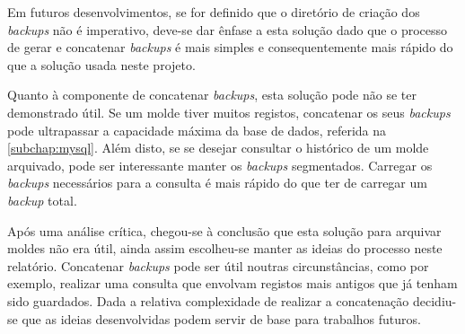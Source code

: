 \documentclass[11pt,twoside,a4paper]{report}
\begin{document}
Em futuros desenvolvimentos, se for definido que o diretório de criação dos \textit{backups} não é imperativo, deve-se dar ênfase a esta solução dado que o processo de gerar e concatenar \textit{backups} é mais simples e consequentemente mais rápido do que a solução usada neste projeto.\par 
Quanto à componente de concatenar \textit{backups}, esta solução pode não se ter demonstrado útil. Se um molde tiver muitos registos, concatenar os seus \textit{backups} pode ultrapassar a capacidade máxima da base de dados, referida na \autoref{subchap:mysql}. Além disto, se se desejar consultar o histórico de um molde arquivado, pode ser interessante manter os \textit{backups} segmentados. Carregar os \textit{backups} necessários para a consulta é mais rápido do que ter de carregar um \textit{backup} total.\par 
Após uma análise crítica, chegou-se à conclusão que esta solução para arquivar moldes não era útil, ainda assim escolheu-se manter as ideias do processo neste relatório. Concatenar \textit{backups} pode ser útil noutras circunstâncias, como por exemplo, realizar uma consulta que envolvam registos mais antigos que já tenham sido guardados. Dada a relativa complexidade de realizar a concatenação decidiu-se que as ideias desenvolvidas podem servir de base para trabalhos futuros.
\end{document}
